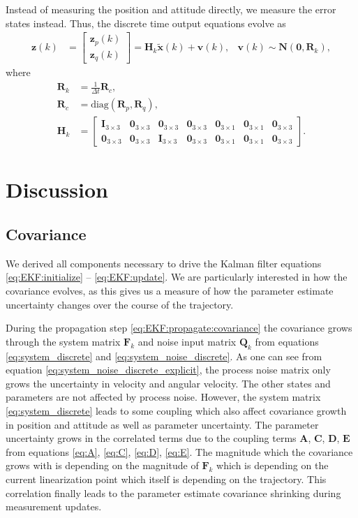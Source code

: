 \documentclass[10pt,a4paper]{article}
\newcommand{\zthree}{\mathbf{0}_{3\times3}}
\newcommand{\zthreeone}{\mathbf{0}_{3\times1}}
\newcommand{\identity}{\mathbf{I}_{3\times3}}
\begin{document}
Instead of measuring the position and attitude directly, we measure the error states instead.  Thus, the discrete time output equations evolve as
\begin{align}
\mathbf{z}(k) &= \begin{bmatrix}
\mathbf{z}_p(k) \\ \mathbf{z}_q(k)
\end{bmatrix} = \mathbf{H}_k \tilde{\mathbf{x}}(k) + \mathbf{v}(k) , &\mathbf{v}(k) \sim \mathcal{\mathbf{N}} \left( \mathbf{0}, \mathbf{R}_k \right), 
\end{align}
where
\begin{align}
\mathbf{R}_k &= \frac{1}{\Delta t} \mathbf{R}_c, \\
\mathbf{R}_c &= \mathrm{diag} \left( \mathbf{R}_p, \mathbf{R}_q \right), \\
\mathbf{H}_k &= \begin{bmatrix}
\identity & \zthree & \zthree & \zthree & \zthreeone & \zthreeone & \zthree \\
\zthree & \zthree & \identity & \zthree & \zthreeone & \zthreeone & \zthree
\end{bmatrix}.
\end{align}

\section{Discussion}

\subsection*{Covariance}
We derived all components necessary to drive the Kalman filter equations \ref{eq:EKF:initialize} -- \ref{eq:EKF:update}. We are particularly interested in how the covariance evolves, as this gives us a measure of how the parameter estimate uncertainty changes over the course of the trajectory. 

During the propagation step \ref{eq:EKF:propagate:covariance} the covariance grows through the system matrix $\mathbf{F}_k$ and noise input matrix $\mathbf{Q}_k$ from equations \ref{eq:system_discrete} and \ref{eq:system_noise_discrete}. As one can see from equation \ref{eq:system_noise_discrete_explicit}, the process noise matrix only grows the uncertainty in velocity and angular velocity. The other states and parameters are not affected by process noise. However, the system matrix \ref{eq:system_discrete} leads to some coupling which also affect covariance growth in position and attitude as well as parameter uncertainty. The parameter uncertainty grows in the correlated terms due to the coupling terms $\mathbf{A}$, $\mathbf{C}$, $\mathbf{D}$, $\mathbf{E}$ from equations \ref{eq:A}, \ref{eq:C}, \ref{eq:D}, \ref{eq:E}. The magnitude which the covariance grows with is depending on the magnitude of $\mathbf{F}_k$ which is depending on the current linearization point which itself is depending on the trajectory. This correlation finally leads to the parameter estimate covariance shrinking during measurement updates.
\end{document}
